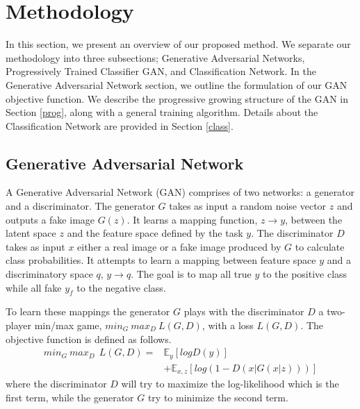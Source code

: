 \documentclass[runningheads]{llncs}
\begin{document}
\section{Methodology}\label{pm}
In this section, we present an overview of our proposed method. We separate our methodology into three subsections; Generative Adversarial Networks, Progressively Trained  Classifier GAN, and Classification Network. In the Generative Adversarial Network section, we outline the formulation of our GAN objective function. We describe the progressive growing structure of the GAN in Section \ref{prog}, along with  a general training algorithm. Details about the Classification Network are  provided in Section \ref{class}.

\subsection{Generative Adversarial Network}

A Generative Adversarial Network (GAN) \cite{Goodfellow-GAN} comprises of two networks:  a generator and a discriminator. The generator $G$  takes  as input a random noise vector $z$   and outputs a fake image $G(z)$. It learns a mapping function, $z \rightarrow y$, between the latent space $z$ and the feature space defined by the task $y$. The discriminator $D$ takes as input  $x$ either  a real image or a fake image produced  by $G$  to calculate class probabilities. It attempts to learn a mapping between feature space $y$ and a discriminatory space $q$, $y \rightarrow q$. The goal is to map all true $y$ to the positive class while all fake $y_f$ to the negative class.

To learn these mappings the generator $G$ plays with the discriminator $D$   a two-player min/max game, $\mathit{min}_G \:\mathit{max}_D\: L(G, D)$, with a loss $L(G, D)$.  The objective function \cite{Goodfellow-GAN} is defined  as follows. 
\begin{equation}
\begin{aligned}
\mathit{min}_G \:\mathit{max}_D\:\:L(G, D) = &\mathbb{E}_{y}[logD(y)] \\
& + \mathbb{E}_{x,z}[log(1 - D(x|G(x|z)))]
\end{aligned}
\end{equation}
where the discriminator $D$ will try to maximize the log-likelihood which is the first term, while the generator $G$ try to minimize the second term.
\end{document}
